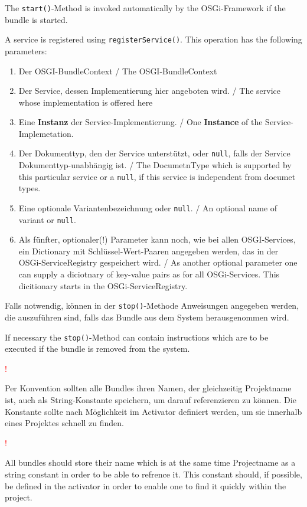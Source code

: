 \documentclass[10pt,a4paper]{scrartcl}
\newcommand{\hinweis}[1]{
\begin{framed}
\begin{minipage}[t]{0.02\textwidth}
\textcolor{red}{\Huge{\sffamily !}}
\end{minipage}
\begin{minipage}[t]{0.94\textwidth}
#1
\end{minipage}
\end{framed}
}
\providecommand{\deng}[2]{#1 / {\sffamily #2}}
\providecommand{\deutsch}[1]{#1}
\providecommand{\englisch}[1]{{\sffamily #1}}
\begin{document}
\englisch{The \texttt{start()}-Method is invoked automatically by the OSGi-Framework if the bundle is started.

A service is registered using \texttt{registerService()}. This operation has the following parameters:}

\begin{enumerate}
 \item \deng{Der OSGI-BundleContext }{The  OSGI-BundleContext}
 \item \deng{Der Service, dessen Implementierung hier angeboten wird.}{The service whose implementation is offered here}
 \item \deng{Eine \textbf{Instanz} der Service-Implementierung.}{One \textbf{Instance} of the Service-Implemetation.}
 \item \deng{Der Dokumenttyp, den der Service unterstützt, oder \texttt{null}, falls
der Service Dokumenttyp-unabhängig ist.}{The DocumetnType which is supported by this particular service or a \texttt{null}, if this service is independent from documet types.}
 \item \deng{Eine optionale Variantenbezeichnung oder \texttt{null}.}{An optional name of variant or \texttt{null}.}
 \item \deng{Als fünfter, optionaler(!) Parameter kann noch, wie bei allen OSGI-Services, ein Dictionary mit 
Schlüssel-Wert-Paaren angegeben werden, das in der OSGi-ServiceRegistry 
gespeichert wird.}{As another optional parameter one can supply a diciotnary of key-value pairs as for all OSGi-Services. This dicitionary starts in the OSGi-ServiceRegistry.}
\end{enumerate}

\deutsch{Falls notwendig, können in der \texttt{stop()}-Methode Anweisungen angegeben werden,
die auszuführen sind, falls das Bundle aus dem System herausgenommen wird.}

\englisch{If necessary the \texttt{stop()}-Method can contain instructions which are to be executed if the bundle is removed from the system.}

\deutsch{\hinweis{Per Konvention sollten alle Bundles ihren Namen, der gleichzeitig Projektname ist,
auch als String-Konstante speichern, um darauf referenzieren zu können. Die Konstante sollte
nach Möglichkeit im Activator definiert werden, um sie innerhalb eines Projektes schnell zu finden.}}

\englisch{\hinweis{All bundles should store their name which is at the same time Projectname as a string constant in order to be able to refrence it. This constant should, if possible, be defined in the activator in order to enable one to find it quickly within the project.}}
\end{document}
